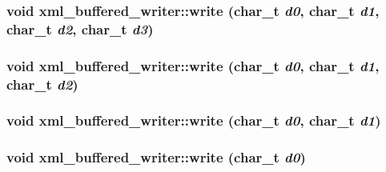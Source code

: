 \hypertarget{classxml__buffered__writer_f679f459dfa0af257c190b8db57e7dcb}{
\subsubsection[write]{\setlength{\rightskip}{0pt plus 5cm}void xml\_\-buffered\_\-writer::write (char\_\-t {\em d0}, char\_\-t {\em d1}, char\_\-t {\em d2}, char\_\-t {\em d3})}}
\label{classxml__buffered__writer_f679f459dfa0af257c190b8db57e7dcb}


\hypertarget{classxml__buffered__writer_f82b277c1ef5c75d1901bb5a8eb4507f}{
\subsubsection[write]{\setlength{\rightskip}{0pt plus 5cm}void xml\_\-buffered\_\-writer::write (char\_\-t {\em d0}, char\_\-t {\em d1}, char\_\-t {\em d2})}}
\label{classxml__buffered__writer_f82b277c1ef5c75d1901bb5a8eb4507f}


\hypertarget{classxml__buffered__writer_4cd6e908908e17c9b07eba34f7317791}{
\subsubsection[write]{\setlength{\rightskip}{0pt plus 5cm}void xml\_\-buffered\_\-writer::write (char\_\-t {\em d0}, char\_\-t {\em d1})}}
\label{classxml__buffered__writer_4cd6e908908e17c9b07eba34f7317791}


\hypertarget{classxml__buffered__writer_1aa829bd551a69dd9005d2d46063308f}{
\subsubsection[write]{\setlength{\rightskip}{0pt plus 5cm}void xml\_\-buffered\_\-writer::write (char\_\-t {\em d0})}}
\label{classxml__buffered__writer_1aa829bd551a69dd9005d2d46063308f}


